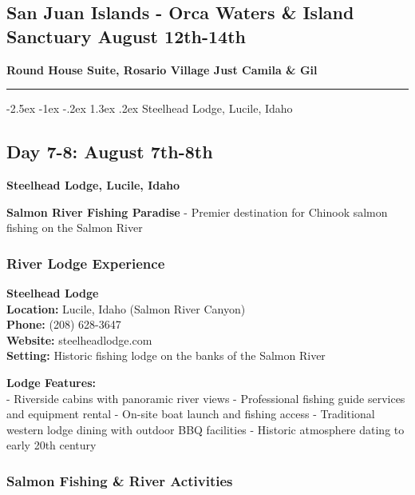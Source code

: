 \documentclass[
  11pt,
  letterpaper,
  DIV=10,
  numbers=noendperiod]{scrartcl}
\makeatletter
\renewcommand{\section}{\@startsection{section}{1}{\z@}%
  {-2.5ex \@plus -1ex \@minus -.2ex}%
  {1.3ex \@plus .2ex}%
  {\normalfont\fontsize{16}{19}\bfseries\color{twinpeaksred}}}
\makeatother
\begin{document}
\subsection{San Juan Islands - Orca Waters \& Island Sanctuary
\textbar{} August
12th-14th}\label{san-juan-islands---orca-waters-island-sanctuary-august-12th-14th}

\textbf{Round House Suite, Rosario Village \textbar{} Just Camila \&
Gil}

\begin{center}\rule{0.5\linewidth}{0.5pt}\end{center}

\section{Steelhead Lodge, Lucile,
Idaho}\label{steelhead-lodge-lucile-idaho}

\subsection{Day 7-8: August 7th-8th}\label{day-7-8-august-7th-8th}

\textbf{Steelhead Lodge, Lucile, Idaho}

\textbf{Salmon River Fishing Paradise} - Premier destination for Chinook
salmon fishing on the Salmon River

\subsubsection{River Lodge Experience}\label{river-lodge-experience}

\textbf{Steelhead Lodge}\\
\textbf{Location:} Lucile, Idaho (Salmon River Canyon)\\
\textbf{Phone:} (208) 628-3647\\
\textbf{Website:} steelheadlodge.com\\
\textbf{Setting:} Historic fishing lodge on the banks of the Salmon
River

\textbf{Lodge Features:}\\
- Riverside cabins with panoramic river views - Professional fishing
guide services and equipment rental - On-site boat launch and fishing
access - Traditional western lodge dining with outdoor BBQ facilities -
Historic atmosphere dating to early 20th century

\subsubsection{Salmon Fishing \& River
Activities}\label{salmon-fishing-river-activities}
\end{document}
